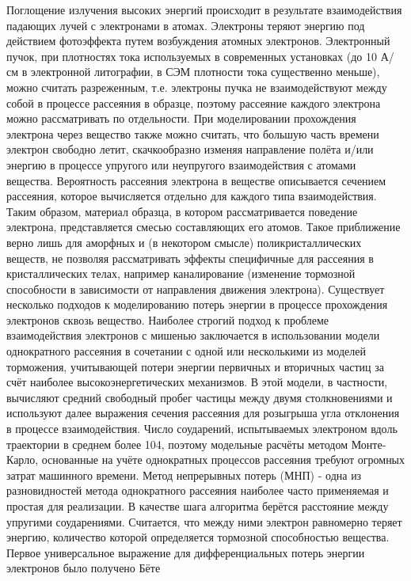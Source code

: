 Поглощение излучения высоких энергий происходит в результате взаимодействия падающих лучей с электронами в атомах. Электроны теряют энергию под действием фотоэффекта путем возбуждения атомных электронов.
Электронный пучок, при плотностях тока используемых в современных установках (до 10 А/см в электронной литографии, в СЭМ плотности тока существенно меньше), можно считать разреженным, т.е. электроны пучка не взаимодействуют между собой в процессе рассеяния в образце, поэтому рассеяние каждого электрона можно рассматривать по отдельности.
При моделировании прохождения электрона через вещество также можно считать, что большую часть времени электрон свободно летит, скачкообразно изменяя направление полёта и/или энергию в процессе упругого или неупругого взаимодействия с атомами вещества. Вероятность рассеяния электрона в веществе описывается сечением рассеяния, которое вычисляется отдельно для каждого типа взаимодействия.
Таким образом, материал образца, в котором рассматривается поведение электрона, представляется смесью составляющих его атомов. Такое приближение верно лишь для аморфных и (в некотором смысле) поликристаллических веществ, не позволяя рассматривать эффекты специфичные для рассеяния в кристаллических телах, например каналирование (изменение тормозной способности в зависимости от направления движения электрона).
Существует несколько подходов к моделированию потерь энергии в процессе прохождения электронов сквозь вещество. Наиболее строгий подход к проблеме взаимодействия электронов с мишенью заключается в использовании модели однократного рассеяния	в сочетании с
одной или несколькими из моделей торможения, учитывающей потери энергии первичных и вторичных частиц за счёт наиболее высокоэнергетических механизмов.
В этой модели, в частности, вычисляют средний свободный пробег частицы между двумя столкновениями и используют далее выражения сечения рассеяния для розыгрыша угла отклонения в процессе взаимодействия. Число соударений, испытываемых электроном вдоль траектории в среднем более 104, поэтому модельные расчёты методом Монте-Карло, основанные на учёте однократных процессов рассеяния требуют огромных затрат машинного времени.
Метод непрерывных потерь (МНП) - одна из разновидностей метода однократного рассеяния наиболее часто применяемая и простая для реализации. В качестве шага алгоритма берётся расстояние между упругими соударениями. Считается, что между ними электрон равномерно теряет энергию, количество которой определяется тормозной способностью вещества.
Первое универсальное выражение для дифференциальных потерь энергии электронов было получено Бёте

